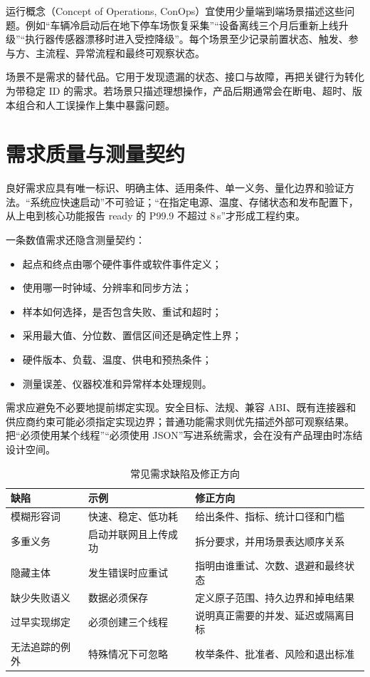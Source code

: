 运行概念（Concept of Operations, ConOps）宜使用少量端到端场景描述这些问题。例如“车辆冷启动后在地下停车场恢复采集”“设备离线三个月后重新上线升级”“执行器传感器漂移时进入受控降级”。每个场景至少记录前置状态、触发、参与方、主流程、异常流程和最终可观察状态。

场景不是需求的替代品。它用于发现遗漏的状态、接口与故障，再把关键行为转化为带稳定 ID 的需求。若场景只描述理想操作，产品后期通常会在断电、超时、版本组合和人工误操作上集中暴露问题。

\section{需求质量与测量契约}

良好需求应具有唯一标识、明确主体、适用条件、单一义务、量化边界和验证方法。“系统应快速启动”不可验证；“在指定电源、温度、存储状态和发布配置下，从上电到核心功能报告 ready 的 P99.9 不超过 8\,s”才形成工程约束。

一条数值需求还隐含测量契约：

\begin{itemize}
  \item 起点和终点由哪个硬件事件或软件事件定义；
  \item 使用哪一时钟域、分辨率和同步方法；
  \item 样本如何选择，是否包含失败、重试和超时；
  \item 采用最大值、分位数、置信区间还是确定性上界；
  \item 硬件版本、负载、温度、供电和预热条件；
  \item 测量误差、仪器校准和异常样本处理规则。
\end{itemize}

需求应避免不必要地提前绑定实现。安全目标、法规、兼容 ABI、既有连接器和供应商约束可能必须指定实现边界；普通功能需求则优先描述外部可观察结果。把“必须使用某个线程”“必须使用 JSON”写进系统需求，会在没有产品理由时冻结设计空间。

\begin{table}[H]
  \centering
  \caption{常见需求缺陷及修正方向}
  \begin{tabular}{p{35mm}p{48mm}p{53mm}}
    \hline
    缺陷 & 示例 & 修正方向 \\
    \hline
    模糊形容词 & 快速、稳定、低功耗 & 给出条件、指标、统计口径和门槛 \\
    多重义务 & 启动并联网且上传成功 & 拆分要求，并用场景表达顺序关系 \\
    隐藏主体 & 发生错误时应重试 & 指明由谁重试、次数、退避和最终状态 \\
    缺少失败语义 & 数据必须保存 & 定义原子范围、持久边界和掉电结果 \\
    过早实现绑定 & 必须创建三个线程 & 说明真正需要的并发、延迟或隔离目标 \\
    无法追踪的例外 & 特殊情况下可忽略 & 枚举条件、批准者、风险和退出标准 \\
    \hline
  \end{tabular}
\end{table}


